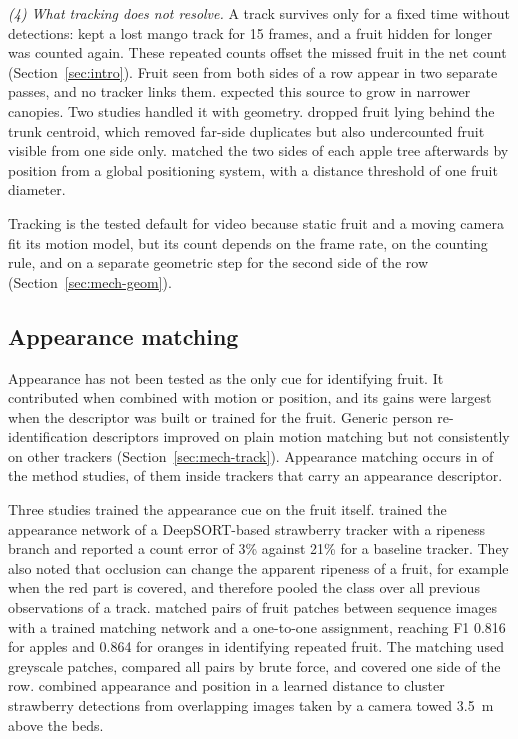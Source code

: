 \textit{(4) What tracking does not resolve.} A track survives only for a fixed time without detections: \citet{wang2019mango} kept a lost mango track for 15 frames, and a fruit hidden for longer was counted again. These repeated counts offset the missed fruit in the net count (Section~\ref{sec:intro}). Fruit seen from both sides of a row appear in two separate passes, and no tracker links them. \citet{wang2019mango} expected this source to grow in narrower canopies. Two studies handled it with geometry. \citet{liu2019monocular} dropped fruit lying behind the trunk centroid, which removed far-side duplicates but also undercounted fruit visible from one side only. \citet{wei2025multi} matched the two sides of each apple tree afterwards by position from a global positioning system, with a distance threshold of one fruit diameter.

Tracking is the tested default for video because static fruit and a moving camera fit its motion model, but its count depends on the frame rate, on the counting rule, and on a separate geometric step for the second side of the row (Section~\ref{sec:mech-geom}).

\subsection{Appearance matching}\label{sec:mech-app}
Appearance has not been tested as the only cue for identifying fruit. It contributed when combined with motion or position, and its gains were largest when the descriptor was built or trained for the fruit. Generic person re-identification descriptors improved on plain motion matching but not consistently on other trackers (Section~\ref{sec:mech-track}). Appearance matching occurs in \nApp of the \nMethod method studies, \nAppTrack of them inside trackers that carry an appearance descriptor.

Three studies trained the appearance cue on the fruit itself. \citet{kirk2021robust} trained the appearance network of a DeepSORT-based strawberry tracker with a ripeness branch and reported a count error of 3\% against 21\% for a baseline tracker. They also noted that occlusion can change the apparent ripeness of a fruit, for example when the red part is covered, and therefore pooled the class over all previous observations of a track. \citet{xia2022culling} matched pairs of fruit patches between sequence images with a trained matching network and a one-to-one assignment, reaching F1 0.816 for apples and 0.864 for oranges in identifying repeated fruit. The matching used greyscale patches, compared all pairs by brute force, and covered one side of the row. \citet{zheng2023object} combined appearance and position in a learned distance to cluster strawberry detections from overlapping images taken by a camera towed 3.5~m above the beds.

